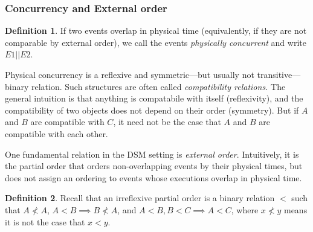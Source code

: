 \documentclass[]             %
{NASA}                       %
\theoremstyle{definition}
\newtheorem{definition}{Definition}[section]
\begin{document}

\subsubsection{Concurrency and External order}
\label{sssec:externalorder}

\begin{definition}
  If two events overlap in physical time (equivalently, if they are
  not comparable by external order), we call the events
  \emph{physically concurrent} and write $E1 || E2$.
\end{definition}

Physical concurrency is a reflexive and symmetric---but usually not
transitive--- binary relation. Such structures are often called
\emph{compatibility relations.} The general intuition is that anything
is compatabile with itself (reflexivity), and the compatibility of two
objects does not depend on their order (symmetry). But if \(A\) and
\(B\) are compatible with \(C\), it need not be the case that \(A\)
and \(B\) are compatible with each other.

One fundamental relation in the DSM setting is \emph{external
order}. Intuitively, it is the partial order that orders
non-overlapping events by their physical times, but does not assign an
ordering to events whose executions overlap in physical time.

\begin{definition}
  Recall that an irreflexive partial order is a binary relation \(<\)
  such that \(A \not < A\), \(A < B \implies B \not < A\), and \(A <
  B, B < C \implies A < C\), where $x \not < y$ means it is not the
  case that $x < y$.
\end{definition}
\end{document}
